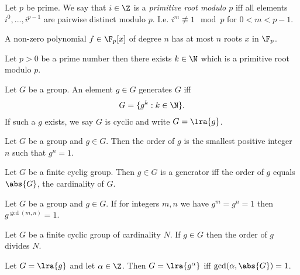 \documentclass{article}
\begin{document}
\begin{definition}
	Let $p$ be prime. We say that $i\in\Z$ is a \emph{primitive root modulo $p$}
	iff all elements $i^0,...,i^{p-1}$ are pairwise distinct modulo $p$. I.e.
	$i^m\not\equiv 1\mod p$ for $0<m<p-1$.
\end{definition}



\begin{theorem}
	A non-zero polynomial $f\in\F_p[x]$ of degree $n$ has at most $n$ roots $x$
	in $\F_p$.
\end{theorem}

\begin{theorem}
	Let $p>0$ be a prime number then there exists $k\in\N$ which is a
	primitive root modulo $p$.
\end{theorem}

\begin{definition}
	Let $G$ be a group. An element $g\in G$ generates $G$ iff
	\begin{align*}
		G = \{g^k : k \in \N\}.
	\end{align*}
	If such a $g$ exists, we say $G$ is cyclic and write $G=\lra{g}$.
\end{definition}

\begin{definition}
	Let $G$ be a group and $g\in G$. Then the order of $g$ is the smallest positive
	integer $n$ such that $g^n = 1$.
\end{definition}

\begin{corollary}
	Let $G$ be a finite cyclig group. Then $g\in G$ is a generator iff the order of
	$g$ equals $\abs{G}$, the cardinality of $G$.
\end{corollary}

\begin{lemma}
	Let $G$ be a group and $g\in G$. If for integers $m,n$ we have $g^m=g^n=1$
	then $g^{\gcd(m,n)}=1$.
\end{lemma}

\begin{theorem}
	Let $G$ be a finite cyclic group of cardinality $N$. If $g\in G$ then
	the order of $g$ divides $N$.
\end{theorem}

\begin{theorem}
	Let $G=\lra{g}$ and let $\alpha\in\Z$. Then $G=\lra{g^\alpha}$ iff
	$\gcd(\alpha,\abs{G})=1$.
\end{theorem}
\end{document}
